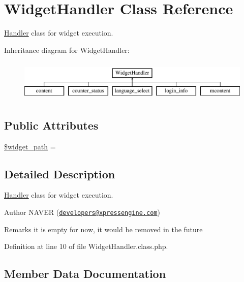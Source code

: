 \hypertarget{classWidgetHandler}{}\section{Widget\+Handler Class Reference}
\label{classWidgetHandler}


\hyperlink{classHandler}{Handler} class for widget execution.  


Inheritance diagram for Widget\+Handler\+:\begin{figure}[H]
\begin{center}
\leavevmode
\includegraphics[height=2.000000cm]{classWidgetHandler}
\end{center}
\end{figure}
\subsection*{Public Attributes}
\begin{DoxyCompactItemize}
\item 
\hyperlink{classWidgetHandler_a153b7e8baf0e97c152eb6d4dfae17e9d}{\$widget\+\_\+path} = \textquotesingle{}\textquotesingle{}
\end{DoxyCompactItemize}


\subsection{Detailed Description}
\hyperlink{classHandler}{Handler} class for widget execution. 

\begin{DoxyAuthor}{Author}
N\+A\+V\+E\+R (\href{mailto:developers@xpressengine.com}{\tt developers@xpressengine.\+com}) 
\end{DoxyAuthor}
\begin{DoxyRemark}{Remarks}
it is empty for now, it would be removed in the future 
\end{DoxyRemark}


Definition at line 10 of file Widget\+Handler.\+class.\+php.



\subsection{Member Data Documentation}
\hypertarget{classWidgetHandler_a153b7e8baf0e97c152eb6d4dfae17e9d}{}
